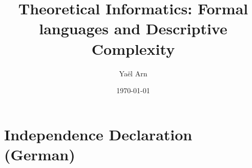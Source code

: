 \documentclass[a4paper,11pt]{report}
\title %
{Theoretical Informatics: Formal languages and Descriptive Complexity}
\date{\today}   %
\author{Yaël Arn}  %
\theoremstyle{definition}
\theoremstyle{definition}
\begin{document}


\onehalfspacing %



\newpage
{}
\tableofcontents %
\newpage %

\renewcommand{\chaptermark}[1]{\markboth{\MakeUppercase{\thechapter.\ #1}}{}} %
\renewcommand{\sectionmark}[1]{\markright{\thesection.\ #1}{}} %
\fancyhead[R]{\rightmark}
\fancyhead[L]{\leftmark}
\fancyhead[L]{\leftmark}
\fancyhead[R]{\rightmark}
\pagestyle{fancy}







\cleardoublepage %
\nocite{*}
\printbibliography %



\appendix





\chapter{Independence Declaration (German)}\label{ch:appendix_independencedeclaration}



\end{document}
